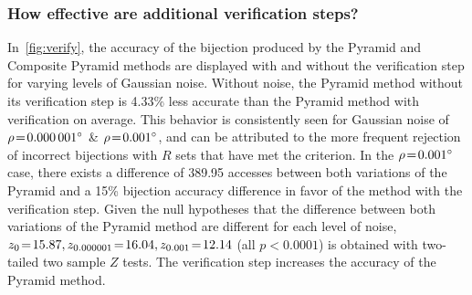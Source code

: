 \subsubsection{How effective are additional verification steps?}
%
%
%
%
%
%

In~\autoref{fig:verify}, the accuracy of the bijection produced by the Pyramid and Composite Pyramid methods are
displayed with and without the verification step for varying levels of Gaussian noise.
Without noise, the Pyramid method without its verification step is 4.33\% less accurate than the Pyramid method with
verification on average.
This behavior is consistently seen for Gaussian noise of $\rho\!=\!\ang{0.000001}$ \& $\rho\!=\!\ang{0.001}$, and
can be attributed to the more frequent rejection of incorrect bijections with $R$ sets that have met the criterion.
In the $\rho\!=\!\ang{0.001}$ case, there exists a difference of 389.95 accesses between both variations of the Pyramid
and a 15\% bijection accuracy difference in favor of the method with the verification step.
Given the null hypotheses that the difference between both variations of the Pyramid method are different for each level
of noise, $z_0 \!=\! 15.87, z_{0.000001} \!=\! 16.04, z_{0.001} \!=\! 12.14$ (all $p\!<\!0.0001$) is obtained with
two-tailed two sample $Z$ tests.
The verification step increases the accuracy of the Pyramid method.

